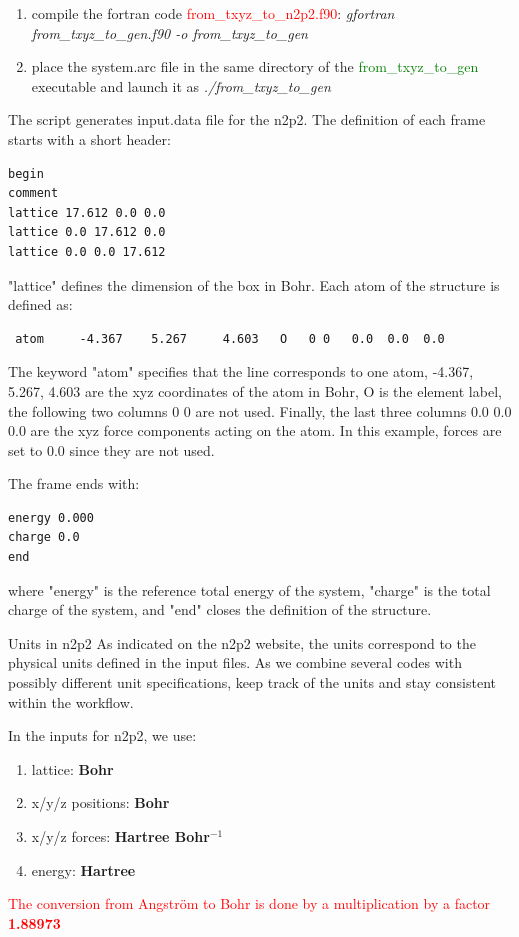 \documentclass[12pt]{article}
\newcommand\Warning{%
 \makebox[1.4em][c]{%
 \makebox[0pt][c]{\raisebox{.1em}{\small!}}%
 \makebox[0pt][c]{\color{red}\Large$\bigtriangleup$}}}%
\begin{document}
\begin{enumerate}
    \item compile the fortran code \textcolor{red}{from\_txyz\_to\_n2p2.f90}:
    \textit{gfortran from\_txyz\_to\_gen.f90 -o from\_txyz\_to\_gen} 
    \item place the system.arc file in the same directory of the \textcolor{green}{from\_txyz\_to\_gen} executable and launch it as \textit{./from\_txyz\_to\_gen}
\end{enumerate}
The script generates input.data file for the n2p2. The definition of each frame starts with a short header:
\vspace{0.5cm}
\begin{verbatim}
begin
comment 
lattice 17.612 0.0 0.0 
lattice 0.0 17.612 0.0 
lattice 0.0 0.0 17.612 
\end{verbatim}
\noindent "lattice" defines the dimension of the box in Bohr.
Each atom of the structure is defined as: \\
\begin{verbatim}
 atom     -4.367    5.267     4.603   O   0 0   0.0  0.0  0.0  
 \end{verbatim}
The keyword "atom" specifies that the line corresponds to one atom, -4.367, 5.267, 4.603 are the xyz coordinates of the atom in Bohr, O is the element label, the following two columns 0 0 are not used. Finally, the last three columns 0.0 0.0 0.0 are the xyz force components acting on the atom. In this example, forces are set to 0.0 since they are not used.
\vspace{0.5cm}

 \noindent The frame ends with: 
\vspace{0.5cm}

\begin{verbatim}
energy 0.000 
charge 0.0 
end 
\end{verbatim}

\noindent where "energy" is the reference total energy of the system, "charge" is the total charge of the system, and "end" closes the definition of the structure. 

\begin{mybox1}{Units in n2p2}
\Warning As indicated on the n2p2 website, the units correspond to the physical units defined in the input files. As we combine several codes with possibly different unit specifications, keep track of the units and stay consistent within the workflow.

In the inputs for n2p2, we use:
\begin{enumerate}
    \item lattice: \textbf{Bohr}
    \item x/y/z positions: \textbf{Bohr}
    \item x/y/z forces: \textbf{Hartree Bohr$^{-1}$}
    \item energy: \textbf{Hartree}
\end{enumerate}

\textcolor{red}{The conversion from Angström to Bohr is done by a multiplication by a factor \textbf{1.88973}}
\end{mybox1}
\end{document}
